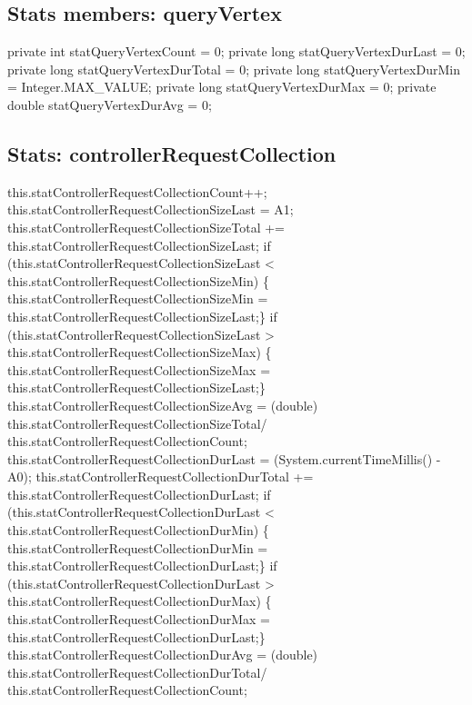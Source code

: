 \subsection{Stats members: queryVertex}
\nwenddocs{}\endmoddef{}
private int    statQueryVertexCount    = 0;
private long   statQueryVertexDurLast  = 0;
private long   statQueryVertexDurTotal = 0;
private long   statQueryVertexDurMin   = Integer.MAX_VALUE;
private long   statQueryVertexDurMax   = 0;
private double statQueryVertexDurAvg   = 0;
\nwendcode{}\nwdocspar

\subsection{Stats: controllerRequestCollection}
\nwenddocs{}\endmoddef{}
    this.statControllerRequestCollectionCount++;
    this.statControllerRequestCollectionSizeLast = A1;
    this.statControllerRequestCollectionSizeTotal +=
    this.statControllerRequestCollectionSizeLast;
if (this.statControllerRequestCollectionSizeLast <
    this.statControllerRequestCollectionSizeMin) \{
    this.statControllerRequestCollectionSizeMin =
    this.statControllerRequestCollectionSizeLast;\}
if (this.statControllerRequestCollectionSizeLast >
    this.statControllerRequestCollectionSizeMax) \{
    this.statControllerRequestCollectionSizeMax =
    this.statControllerRequestCollectionSizeLast;\}
    this.statControllerRequestCollectionSizeAvg = (double)
    this.statControllerRequestCollectionSizeTotal/
    this.statControllerRequestCollectionCount;
    this.statControllerRequestCollectionDurLast = (System.currentTimeMillis() - A0);
    this.statControllerRequestCollectionDurTotal +=
    this.statControllerRequestCollectionDurLast;
if (this.statControllerRequestCollectionDurLast <
    this.statControllerRequestCollectionDurMin) \{
    this.statControllerRequestCollectionDurMin =
    this.statControllerRequestCollectionDurLast;\}
if (this.statControllerRequestCollectionDurLast >
    this.statControllerRequestCollectionDurMax) \{
    this.statControllerRequestCollectionDurMax =
    this.statControllerRequestCollectionDurLast;\}
    this.statControllerRequestCollectionDurAvg = (double)
    this.statControllerRequestCollectionDurTotal/
    this.statControllerRequestCollectionCount;
\nwendcode{}\nwdocspar

